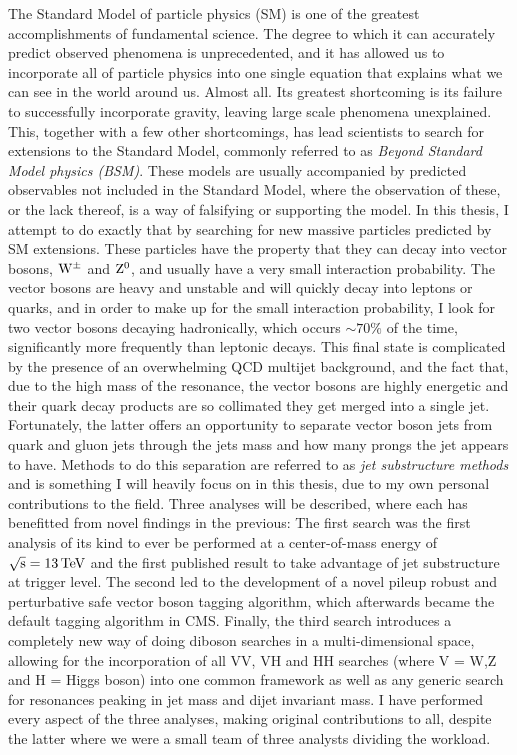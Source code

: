 \noindent The Standard Model of particle physics (SM) is one of the greatest accomplishments of fundamental science. The degree to which it can accurately predict observed phenomena is unprecedented, and it has allowed us to incorporate all of particle physics into one single equation that explains what we can see in the world around us. Almost all. Its greatest shortcoming is its failure to successfully incorporate gravity, leaving large scale phenomena unexplained. This, together with a few other shortcomings, has lead scientists to search for extensions to the Standard Model, commonly referred to as \emph{Beyond Standard Model physics (BSM)}. These models are usually accompanied by predicted observables not included in the Standard Model, where the observation of these, or the lack thereof, is a way of falsifying or supporting the model.\newline
In this thesis, I attempt to do exactly that by searching for new massive particles predicted by SM extensions. These particles have the property that they can decay into vector bosons, $\mathrm{W}^{\pm}$ and $\mathrm{Z}^{0}$, and usually have a very small interaction probability. The vector bosons are heavy and unstable and will quickly decay into leptons or quarks, and in order to make up for the small interaction probability, I look for two vector bosons decaying hadronically, which occurs $\sim70\%$ of the time, significantly more frequently than leptonic decays. This final state is complicated by the presence of an overwhelming QCD multijet background, and the fact that, due to the high mass of the resonance, the vector bosons are highly energetic and their quark decay products are so collimated they get merged into a single jet. Fortunately, the latter offers an opportunity to separate vector boson jets from quark and gluon jets through the jets mass and how many prongs the jet appears to have. Methods to do this separation are referred to as \emph{jet substructure methods} and is something I will heavily focus on in this thesis, due to my own personal contributions to the field. \newline
Three analyses will be described, where each has benefitted from novel findings in the previous: The first search was the first analysis of its kind to ever be performed at a center-of-mass energy of $\sqrt{\rm{s}}=13 \,\text{Te\hspace{-.08em}V}$ and the first published result to take advantage of jet substructure at trigger level. The second led to the development of a novel pileup robust and perturbative safe vector boson tagging algorithm, which afterwards became the default tagging algorithm in CMS. Finally, the third search introduces a completely new way of doing diboson searches in a multi-dimensional space, allowing for the incorporation of all VV, VH and HH searches (where V = W,Z and H = Higgs boson) into one common framework as well as any generic search for resonances peaking in jet mass and dijet invariant mass. I have performed every aspect of the three analyses, making original contributions to all, despite the latter where we were a small team of three analysts dividing the workload.\newline
